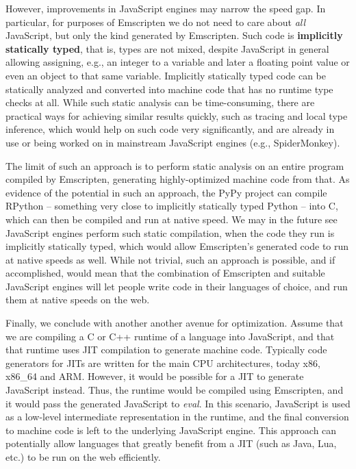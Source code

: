 \documentclass[11pt]{proc}
\begin{document}
However, improvements in JavaScript engines may narrow the speed
gap. In particular, for purposes of Emscripten we do not need to
care about \emph{all} JavaScript, but only the kind generated by
Emscripten. Such code is \textbf{implicitly statically typed}, that is,
types are not mixed, despite JavaScript in general allowing assigning, e.g., an
integer to a variable and later a floating point value or even an object to that same variable. Implicitly statically
typed code can be statically analyzed and converted into
machine code that has no runtime type checks at all. While such
static analysis can be time-consuming, there are practical ways for
achieving similar results quickly, such as tracing and local type inference, which
would help on such code very significantly, and are already in use
or being worked on in mainstream JavaScript engines (e.g., SpiderMonkey).

The limit of such an approach is to perform static analysis on
an entire program compiled by Emscripten, generating highly-optimized
machine code from that. As evidence of the potential in such an
approach, the PyPy project can compile RPython -- something very close to implicitly
statically typed Python -- into C, which can then be compiled
and run at native speed. We may in the future see
JavaScript engines perform such static compilation, when the code
they run is implicitly statically typed, which would allow Emscripten's generated
code to run at native speeds as well. While not trivial, such an
approach is possible, and if accomplished, would mean that
the combination of Emscripten and suitable JavaScript engines will
let people write code in their languages of choice, and run them
at native speeds on the web.

Finally, we conclude with another another avenue for optimization.
Assume that we are compiling a C or C++ runtime of a language
into JavaScript, and that that runtime uses JIT compilation to generate machine code. Typically
code generators for JITs are written for the main CPU architectures, today
x86, x86\_64 and ARM. However, it would be possible for a JIT to
generate JavaScript instead. Thus, the runtime would be compiled using
Emscripten, and it would pass the generated JavaScript to
\emph{eval}. In this
scenario, JavaScript is used as a low-level intermediate representation in
the runtime, and the final conversion to machine code is left to the underlying
JavaScript engine. This approach can potentially allow languages that 
greatly benefit from a JIT (such as Java, Lua, etc.) to be run on the web
efficiently.
\end{document}
